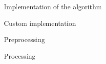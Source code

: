 \documentclass[9pt]{extarticle}
\begin{document}
\begin{section}{Implementation of the algorithm}
\begin{subsection}{Custom implementation}
            \begin{subsubsection}{Preprocessing}
            \end{subsubsection}

            \begin{subsubsection}{Processing}


            \end{subsubsection}


\end{subsection}
\end{section}
\end{document}
